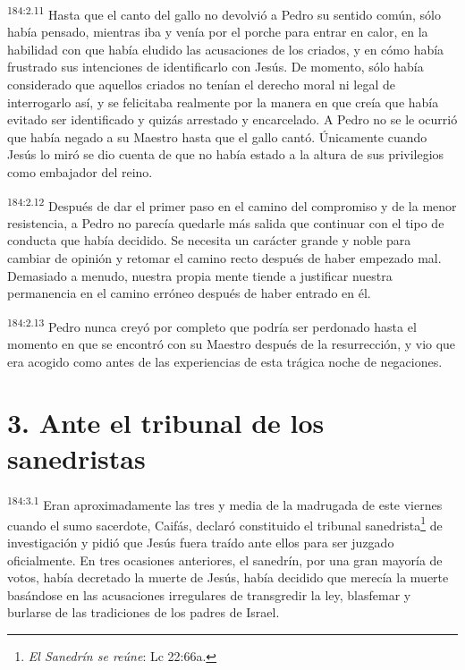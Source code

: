 \par
\textsuperscript{184:2.11} Hasta que el canto del gallo no devolvió a Pedro su sentido común, sólo había pensado, mientras iba y venía por el porche para entrar en calor, en la habilidad con que había eludido las acusaciones de los criados, y en cómo había frustrado sus intenciones de identificarlo con Jesús. De momento, sólo había considerado que aquellos criados no tenían el derecho moral ni legal de interrogarlo así, y se felicitaba realmente por la manera en que creía que había evitado ser identificado y quizás arrestado y encarcelado. A Pedro no se le ocurrió que había negado a su Maestro hasta que el gallo cantó. Únicamente cuando Jesús lo miró se dio cuenta de que no había estado a la altura de sus privilegios como embajador del reino.

\par
\textsuperscript{184:2.12} Después de dar el primer paso en el camino del compromiso y de la menor resistencia, a Pedro no parecía quedarle más salida que continuar con el tipo de conducta que había decidido. Se necesita un carácter grande y noble para cambiar de opinión y retomar el camino recto después de haber empezado mal. Demasiado a menudo, nuestra propia mente tiende a justificar nuestra permanencia en el camino erróneo después de haber entrado en él.

\par
\textsuperscript{184:2.13} Pedro nunca creyó por completo que podría ser perdonado hasta el momento en que se encontró con su Maestro después de la resurrección, y vio que era acogido como antes de las experiencias de esta trágica noche de negaciones.

\section*{3. Ante el tribunal de los sanedristas}
\par
\textsuperscript{184:3.1} Eran aproximadamente las tres y media de la madrugada de este viernes cuando el sumo sacerdote, Caifás, declaró constituido el tribunal sanedrista\footnote{\textit{El Sanedrín se reúne}: Lc 22:66a.} de investigación y pidió que Jesús fuera traído ante ellos para ser juzgado oficialmente. En tres ocasiones anteriores, el sanedrín, por una gran mayoría de votos, había decretado la muerte de Jesús, había decidido que merecía la muerte basándose en las acusaciones irregulares de transgredir la ley, blasfemar y burlarse de las tradiciones de los padres de Israel.

